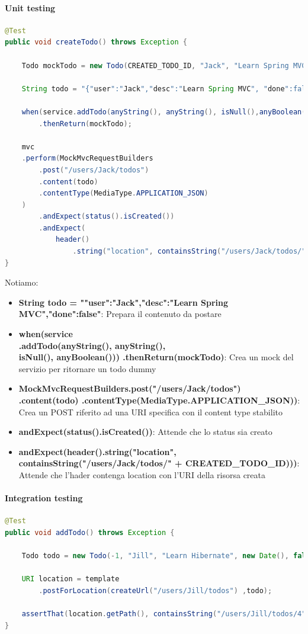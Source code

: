 \documentclass[11pt,a4paper]{book}
\begin{document}
\paragraph{Unit testing}
\begin{lstlisting}[language = Java]
@Test
public void createTodo() throws Exception {
	
	Todo mockTodo = new Todo(CREATED_TODO_ID, "Jack", "Learn Spring MVC", new Date(), false);

	String todo = "{"user":"Jack","desc":"Learn Spring MVC", "done":false}";

	when(service.addTodo(anyString(), anyString(), isNull(),anyBoolean()))
		.thenReturn(mockTodo);
	
	mvc
	.perform(MockMvcRequestBuilders
		.post("/users/Jack/todos")
		.content(todo)
		.contentType(MediaType.APPLICATION_JSON)
	)
		.andExpect(status().isCreated())
		.andExpect(
			header()
				.string("location", containsString("/users/Jack/todos/"	+ CREATED_TODO_ID)));
}
\end{lstlisting}
Notiamo:
\begin{itemize}
	\item \textbf{String todo = "{"user":"Jack","desc":"Learn Spring
		MVC","done":false}"}: Prepara il contenuto da postare
	\item \textbf{when(service \\
		.addTodo(anyString(), anyString(), \\
			isNull(), anyBoolean()))
		.thenReturn(mockTodo)}: Crea un mock del servizio per ritornare un todo dummy
	\item \textbf{MockMvcRequestBuilders.post("/users/Jack/todos")
		.content(todo)
		.contentType(MediaType.APPLICATION\_JSON))}: Crea un POST riferito ad una URI specifica con il content type stabilito
	\item \textbf{andExpect(status().isCreated())}: Attende che lo status sia creato
	\item \textbf{andExpect(header().string("location",
		containsString("/users/Jack/todos/" +
			CREATED\_TODO\_ID)))}: Attende che l'hader contenga location con l'URI della risorsa creata
\end{itemize}

\paragraph{Integration testing}
\begin{lstlisting}[language = Java]
@Test
public void addTodo() throws Exception {
	
	Todo todo = new Todo(-1, "Jill", "Learn Hibernate", new Date(), false);
	
	URI location = template
		.postForLocation(createUrl("/users/Jill/todos") ,todo);
	
	assertThat(location.getPath(), containsString("/users/Jill/todos/4"));
}
\end{lstlisting}
\end{document}
